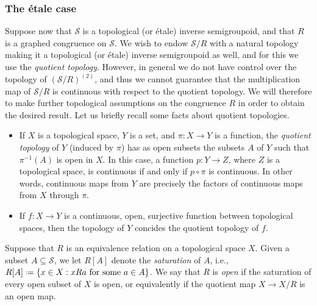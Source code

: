 \subsubsection*{The étale case}

Suppose now that $\mathcal{S}$ is a topological (or étale) inverse semigroupoid, and that $R$ is a graphed congruence on $\mathcal{S}$. We wish to endow $\mathcal{S}/R$ with a natural topology making it a topological (or étale) inverse semigroupoid as well, and for this we use the \emph{quotient topology}. However, in general we do not have control over the topology of $(\mathcal{S}/R)^{(2)}$, and thus we cannot guarantee that the multiplication map of $\mathcal{S}/R$ is continuous with respect to the quotient topology. We will therefore to make further topological assumptions on the congruence $R$ in order to obtain the desired result. Let us briefly recall some facts about quotient topologies.

\begin{itemize}
    \item If $X$ is a topological space, $Y$ is a set, and $\pi\colon X\to Y$ is a function, the \emph{quotient topology} of $Y$ (induced by $\pi$) has as open subsets the subsets $A$ of $Y$ such that $\pi^{-1}(A)$ is open in $X$. In this case, a function $p\colon Y\to Z$, where $Z$ is a topological space, is continuous if and only if $p\circ\pi$ is continuous. In other words, continuous maps from $Y$ are precisely the factors of continuous maps from $X$ through $\pi$.
    \item If $f\colon X\to Y$ is a continuous, open, surjective function between topological spaces, then the topology of $Y$ concides the quotient topology of $f$.
\end{itemize}

Suppose that $R$ is an equivalence relation on a topological space $X$. Given a subset $A\subseteq\mathcal{S}$, we let $R[A]$ denote the \emph{saturation} of $A$, i.e., $R[A]\defeq\left\{x\in X:xRa\text{ for some }a\in A\right\}$. 
We say that $R$ is \emph{open} if the saturation of every open subset of $X$ is open, or equivalently if the quotient map $X\to X/R$ is an open map.

